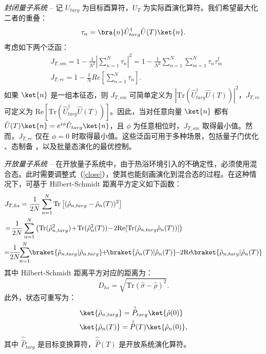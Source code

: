\textit{封闭量子系统} -- 记 $U_{targ}$ 为目标酉算符，$U_{T}$ 为实际酉演化算符。我们希望最大化二者的重叠：
\begin{equation}
    \tau_{n}=\bra{n}\hat{U}_{targ}^{\dagger}\hat{U}(T)\ket{n}.
\end{equation}
考虑如下两个泛函：
\begin{equation}
    \begin{split}
        &J_{T,sm}=1-\frac{1}{N^{2}}\left|\sum_{n=1}^{N}\tau_{n}\right|^{2}=1-\frac{1}{N^{2}}\sum_{n=1}^{N}\sum_{m=1}^{N}\tau_{n}\tau_{m}^{\dagger}\\
        &J_{T,re}=1-\frac{1}{N}Re\left[\sum_{n=1}^{N}\tau_{n}\right].
    \end{split}
    \label{close}
\end{equation}
如果 ${\ket{n}}$ 是一组本征态，则 $J_{T,sm}$ 可简单定义为 $\left|\text{Tr}(\hat{U}_{targ}^{\dagger}\hat{U}(T))\right|^{2}$，$J_{T,re}$ 可定义为 $\text{Re}[\text{Tr}(\hat{U}^{\dagger}_{targ}\hat{U}(T))]$。因此，当对任意向量 $\ket{n}$ 都有 $\hat{U}(T)\ket{n}=e^{i\phi}\hat{U}_{targ}\ket{n}$，且 $\phi$ 为任意相位时，$J_{T,sm}$ 取得最小值。然而，$J_{T,re}$ 仅在 $\phi=0$ 时取得最小值。这些泛函可用于多种场景，包括量子门优化 \cite{He_2024}、态制备 \cite{He_2021, refId0}，以及批量态演化的最优控制。

\textit{开放量子系统} -- 在开放量子系统中，由于热浴环境引入的不确定性，必须使用混合态。此时需要调整式（\ref{close}），使其也能刻画演化到混合态的过程。在这种情况下，可基于 Hilbert-Schmidt 距离平方定义如下函数：
\begin{equation}
    \begin{split}
        &J_{T,hs}=\frac{1}{2N}\sum_{n=1}^{N}\text{Tr}\left[(\hat{\rho}_{n,targ}-\hat{\rho}_{n}(T))^{2}\right]\\
        &\!=\!\frac{1}{2N}\sum_{n=1}^{N}\left(\text{Tr}(\hat{\rho}^{2}_{n,targ})\!+\!\text{Tr}(\hat{\rho}^{2}_{n}(T))\!-\!2\mathrm{Re}[\text{Tr}(\hat{\rho}_{n,targ}\hat{\rho}_{n}(T))]\right)\\
        &\!\!=\!\!\frac{1}{2N}\!\!\sum_{n=1}^{N}\!\!\braket{\hat{\rho}_{n,targ}|\hat{\rho}_{n,targ}}\!\!+\!\!\braket{\hat{\rho}_{n}(T)|\hat{\rho}_{n}(T)}\!\!-\!\!2\mathrm{Re}\!\braket{{\hat{\rho}_{n,targ}|\hat{\rho}_{n}(T)}}
    \end{split}
\end{equation}
其中 Hilbert-Schmidt 距离平方对应的距离为：
\begin{equation}
    D_{hs}=\sqrt{\mathrm{Tr}(\hat{\sigma}-\hat{\rho})^{2}}.
\end{equation}
此外，状态可重写为：
\begin{equation}
    \begin{split}
        &\ket{\hat{\rho}_{n,targ}}=\hat{\hat{P}}_{targ}\ket{\hat{\rho}(0)}\\
        &\ket{\hat{\rho}_{n}(T)}=\hat{\hat{P}}(T)\ket{\hat{\rho}_{n}(0)},
    \end{split}
\end{equation}
其中 $\hat{\hat{P}}_{targ}$ 是目标变换算符，$\hat{\hat{P}}(T)$ 是开放系统演化算符。

